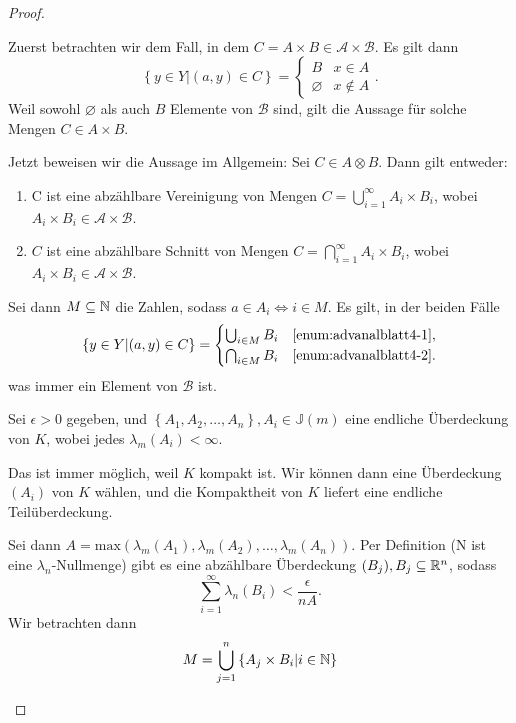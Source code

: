 \begin{proof}
	\begin{parts}
	\item Zuerst betrachten wir dem Fall, in dem $C=A\times B\in \mathcal{A}\times \mathcal{B}$. Es gilt dann
		\[
		\left\{ y\in Y|(a,y)\in C \right\} =\begin{cases}
			B & x\in A\\
			\varnothing & x \not\in A
		\end{cases}
		.\]
		Weil sowohl $\varnothing$ als auch $B$ Elemente von $\mathcal{B}$ sind, gilt die Aussage f\"{u}r solche Mengen $C\in A \times B$.

		Jetzt beweisen wir die Aussage im Allgemein: Sei $C\in A\otimes B$. Dann gilt entweder:
		\begin{enumerate}[label=(\roman*)]
			\item C ist eine abzählbare Vereinigung von Mengen $C=\bigcup_{i=1}^\infty A_i\times B_i$, wobei $A_i\times B_i\in \mathcal{A}\times \mathcal{B}$.\label{enum:advanalblatt4-1}
			\item $C$ ist eine abzählbare Schnitt von Mengen $C=\bigcap_{i=1}^\infty A_i\times B_i$, wobei $A_i\times B_i\in \mathcal{A}\times \mathcal{B}$. \label{enum:advanalblatt4-2}
		\end{enumerate}
Sei dann $M\subseteq \mathbb{N}$ die Zahlen, sodass $a\in A_i \iff i\in M$. Es gilt, in der beiden Fälle
\[
\left\{ y\in Y|(a,y)\in C \right\}=\begin{cases}
	\bigcup_{i\in M} B_i & \ref{enum:advanalblatt4-1},\\
	\bigcap_{i\in M} B_i & \ref{enum:advanalblatt4-2}.
\end{cases}
\] 
was immer ein Element von $\mathcal{B}$ ist.
	\item Sei $\epsilon>0$ gegeben, und $\left\{ A_1,A_2,\dots,A_n \right\},A_i\in\mathbb{J}(m)$ eine endliche Überdeckung von $K$, wobei jedes $\lambda_m(A_i)<\infty$. 
		\begin{tcolorbox}
			Das ist immer möglich, weil $K$ kompakt ist. Wir können dann eine Überdeckung $(A_i)$ von $K$ wählen, und die Kompaktheit von $K$ liefert eine endliche Teilüberdeckung. 
		\end{tcolorbox}
		Sei dann $A=\text{max}\left( \lambda_m(A_1),\lambda_m(A_2),\dots, \lambda_m(A_n) \right)$. Per Definition (N ist eine $\lambda_n$-Nullmenge) gibt es eine abzählbare Überdeckung $(B_j),B_j\subseteq \mathbb{R}^n$, sodass
		 \[
		\sum_{i=1}^{\infty} \lambda_n(B_i)<\frac{\epsilon}{nA}
		.\] 
		Wir betrachten dann
		\[
		M=\bigcup_{j=1}^n\left\{ A_j\times B_i|i\in \mathbb{N} \right\}  
\]
\end{parts}
\end{proof}
